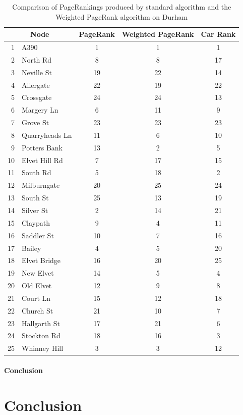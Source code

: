 \documentclass[11pt]{report}
\begin{document}
{\begin{table}[h] \caption{Comparison of PageRankings produced by standard algorithm and the Weighted PageRank algorithm on Durham}
 \centering
 \begin{tabular} {r l| c c| c} 
 \multicolumn{2}{c|}{Node}& PageRank & Weighted PageRank & Car Rank\\ [0.5ex] 
 \hline
 1&A390&1&1&1\\
 2&North Rd&8&8&17\\
 3&Neville St&19&22&14\\
 4&Allergate&22&19&22\\
 5&Crossgate&24&24&13\\
 6&Margery Ln&6&11&9\\
 7&Grove St&23&23&23\\
 8&Quarryheads Ln&11&6&10\\
 9&Potters Bank&13&2&5\\
 10&Elvet Hill Rd&7&17&15\\
 11&South Rd&5&18&2\\
 12&Milburngate&20&25&24\\
 13&South St&25&13&19\\
 14&Silver St&2&14&21\\
 15&Claypath&9&4&11\\
 16&Saddler St&10&7&16\\
 17&Bailey&4&5&20\\
 18&Elvet Bridge&16&20&25\\
 19&New Elvet&14&5&4\\
 20&Old Elvet&12&9&8\\
 21&Court Ln&15&12&18\\
 22&Church St&21&10&7\\
 23&Hallgarth St&17&21&6\\
 24&Stockton Rd&18&16&3\\
 25&Whinney Hill&3&3&12\\
  \end{tabular}
 \label{Table:Durham comparison}
\end{table}


\FloatBarrier

\subsubsection{Conclusion} \label{sec:Durham conc}
\chapter{Conclusion} \label{chap:Conclusion}

}
\end{document}
